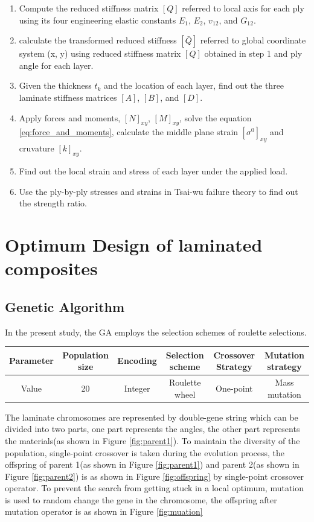 \documentclass[smallextended]{svjour3}       %
\begin{document}
\begin{enumerate}
	\item Compute the reduced stiffness matrix $[Q]$ referred to local axis for each ply using its
		four engineering elastic constants $E_1$, $E_2$, $v_{12}$, and $G_{12}$.
	\item calculate the transformed reduced stiffness $[\bar{Q}]$ referred to global coordinate
		system (x, y) using reduced stiffness matrix $[Q]$ obtained in step 1 and ply angle for each layer.
	\item Given the thickness $t_k$ and the location of each layer, find out the three laminate
		stiffness matrices $[A]$, $[B]$, and $[D]$.
	\item Apply forces and moments, $[N]_{xy}$, $[M]_{xy}$, solve the equation
		\ref{eq:force_and_moments}, calculate the middle plane strain $[\sigma^0]_{xy}$ and
		cruvature $[k]_{xy}$.
	\item Find out the local strain and stress of each layer under the applied load.
	\item Use the ply-by-ply stresses and strains in Tsai-wu failure theory to find out the strength
		ratio.
\end{enumerate}

\section {Optimum Design of laminated composites}
\subsection{Genetic Algorithm}
In the present study, the GA employs the selection schemes of roulette
selections.  

\begin{center}
\begin{tabular}{cccccc}
	\toprule
	Parameter &  Population size & Encoding & Selection scheme& Crossover Strategy& Mutation strategy\\
	\midrule
	Value     & 20               & Integer  & Roulette wheel  & One-point &Mass mutation   \\
	\bottomrule
\end{tabular}
\end{center}


The laminate chromosomes are represented by double-gene string
which can be divided into two parts, one part represents the angles, the other
part represents the materials(as shown in Figure \ref{fig:parent1}). To maintain
the diversity of the population, single-point crossover is taken during the
evolution process, the offspring of parent 1(as shown in Figure
\ref{fig:parent1}) and parent 2(as shown in Figure \ref{fig:parent2}) is as
shown in Figure \ref{fig:offspring} by single-point crossover operator. To prevent the
search from getting stuck in a local optimum, mutation is used to random change
the gene in the chromosome, the offspring after mutation operator is as shown
in Figure \ref{fig:muation}
\end{document}

